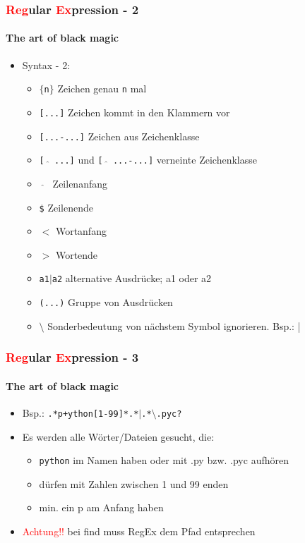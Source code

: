 \documentclass[12pt,utf8]{beamer}
\begin{document}
\begin{frame}
\frametitle{\textcolor{red}{Reg}ular \textcolor{red}{Ex}pression - 2}
\framesubtitle{\textcolor{ownDarkOr}{The art of black magic}}
\begin{itemize}
	\item Syntax - 2:
	\begin{itemize}[<+->]
		\item {\scriptsize \texttt{$\{$n$\}$} Zeichen genau \texttt{n} mal}
		\item {\scriptsize \texttt{[...]} Zeichen kommt in den Klammern vor}
		\item {\scriptsize \texttt{[...-...]} Zeichen aus Zeichenklasse}
		\item {\scriptsize \texttt{[ $\hat{}$ ...]} und \texttt{[ $\hat{}$ ...-...]} verneinte Zeichenklasse}
		\item {\scriptsize \texttt{ $\hat{}$ } Zeilenanfang}
		\item {\scriptsize \texttt{\$} Zeilenende}
		\item {\scriptsize \texttt{$<$} Wortanfang}
		\item {\scriptsize \texttt{$>$} Wortende}
		\item {\scriptsize \texttt{a1$\mid$a2} alternative Ausdrücke; a1 oder a2}
		\item {\scriptsize \texttt{(...)} Gruppe von Ausdrücken}
		\item {\scriptsize \texttt{$\setminus$} Sonderbedeutung von nächstem Symbol ignorieren. Bsp.: |}
	\end{itemize}
\end{itemize}
\end{frame}

\begin{frame}
\frametitle{\textcolor{red}{Reg}ular \textcolor{red}{Ex}pression - 3}
\framesubtitle{\textcolor{ownDarkOr}{The art of black magic}}
\begin{itemize}
	\item Bsp.: \texttt{.*p+ython[1-99]*.*$\mid$.*$\setminus$.pyc?}
	\item Es werden alle Wörter/Dateien gesucht, die:
	\begin{itemize}[<+->]
		\item \texttt{python} im Namen haben oder mit .py bzw. .pyc aufhören
		\item dürfen mit Zahlen zwischen 1 und 99 enden
		\item min. ein p am Anfang haben
	\end{itemize}
	\item \textcolor{red}{Achtung!!} bei find muss RegEx dem Pfad entsprechen
\end{itemize}
\end{frame}
\end{document}
